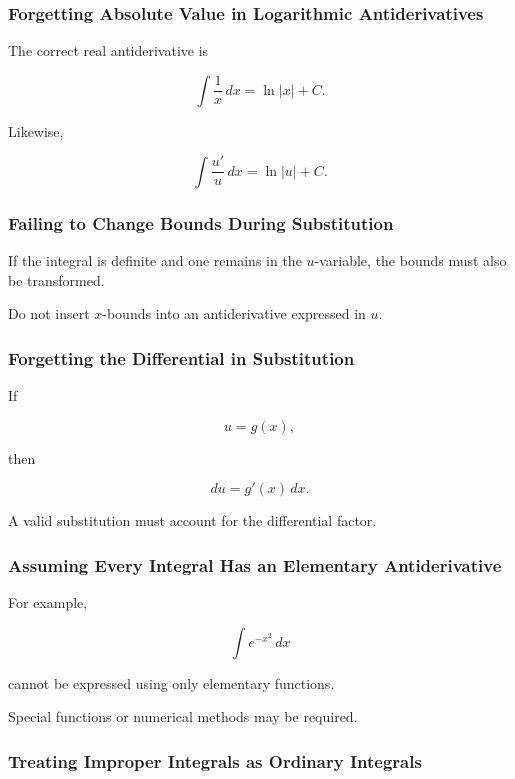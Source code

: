 \subsubsection{Forgetting Absolute Value in Logarithmic Antiderivatives}

The correct real antiderivative is

\[
\boxed{
\int
\frac1x
\,dx
=
\ln|x|+C.
}
\]

Likewise,

\[
\boxed{
\int
\frac{
u'
}{
u
}
\,dx
=
\ln|u|+C.
}
\]

\subsubsection{Failing to Change Bounds During Substitution}

If the integral is definite and one remains in the \(u\)-variable, the bounds
must also be transformed.

Do not insert \(x\)-bounds into an antiderivative expressed in \(u\).

\subsubsection{Forgetting the Differential in Substitution}

If

\[
u=g(x),
\]

then

\[
\boxed{
du=g'(x)\,dx.
}
\]

A valid substitution must account for the differential factor.

\subsubsection{Assuming Every Integral Has an Elementary Antiderivative}

For example,

\[
\boxed{
\int e^{-x^2}\,dx
}
\]

cannot be expressed using only elementary functions.

Special functions or numerical methods may be required.

\subsubsection{Treating Improper Integrals as Ordinary Integrals}

